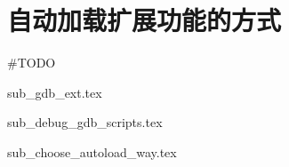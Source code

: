 \section{自动加载扩展功能的方式}

\#TODO

{sub_gdb_ext.tex}

{sub_debug_gdb_scripts.tex}

{sub_choose_autoload_way.tex}

